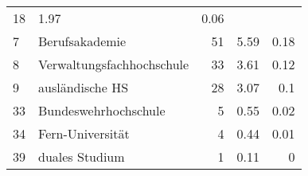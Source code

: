 \begin{longtable}{lXrrr}
       \num{18} &
       \num[round-mode=places,round-precision=2]{1,97} &
         \num[round-mode=places,round-precision=2]{0,06} \\

     7 &
     \multicolumn{1}{X}{ Berufsakademie   } &


       \num{51} &
       \num[round-mode=places,round-precision=2]{5,59} &
         \num[round-mode=places,round-precision=2]{0,18} \\

     8 &
     \multicolumn{1}{X}{ Verwaltungsfachhochschule   } &


       \num{33} &
       \num[round-mode=places,round-precision=2]{3,61} &
         \num[round-mode=places,round-precision=2]{0,12} \\

     9 &
     \multicolumn{1}{X}{ ausländische HS   } &


       \num{28} &
       \num[round-mode=places,round-precision=2]{3,07} &
         \num[round-mode=places,round-precision=2]{0,1} \\

     33 &
     \multicolumn{1}{X}{ Bundeswehrhochschule   } &


       \num{5} &
       \num[round-mode=places,round-precision=2]{0,55} &
         \num[round-mode=places,round-precision=2]{0,02} \\

     34 &
     \multicolumn{1}{X}{ Fern-Universität   } &


       \num{4} &
       \num[round-mode=places,round-precision=2]{0,44} &
         \num[round-mode=places,round-precision=2]{0,01} \\

     39 &
     \multicolumn{1}{X}{ duales Studium   } &


       \num{1} &
       \num[round-mode=places,round-precision=2]{0,11} &
         \num[round-mode=places,round-precision=2]{0} \\


\end{longtable}
